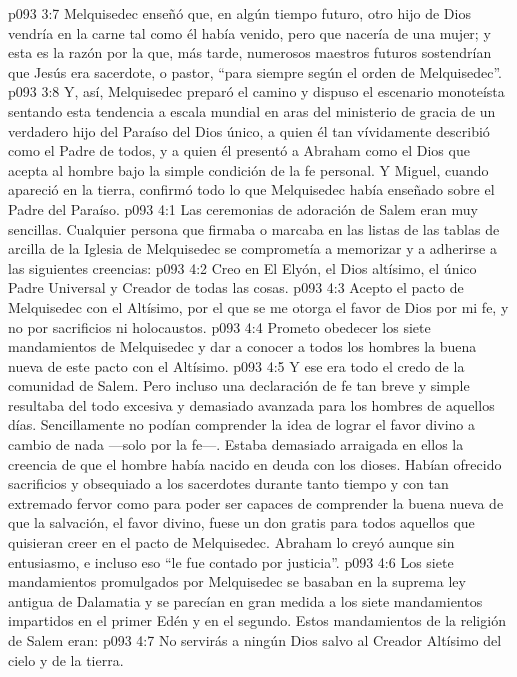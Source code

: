 \vs p093 3:7 Melquisedec enseñó que, en algún tiempo futuro, otro hijo de Dios vendría en la carne tal como él había venido, pero que nacería de una mujer; y esta es la razón por la que, más tarde, numerosos maestros futuros sostendrían que Jesús era sacerdote, o pastor, “para siempre según el orden de Melquisedec”.
\vs p093 3:8 Y, así, Melquisedec preparó el camino y dispuso el escenario monoteísta sentando esta tendencia a escala mundial en aras del ministerio de gracia de un verdadero hijo del Paraíso del Dios único, a quien él tan vívidamente describió como el Padre de todos, y a quien él presentó a Abraham como el Dios que acepta al hombre bajo la simple condición de la fe personal. Y Miguel, cuando apareció en la tierra, confirmó todo lo que Melquisedec había enseñado sobre el Padre del Paraíso.
\vs p093 4:1 Las ceremonias de adoración de Salem eran muy sencillas. Cualquier persona que firmaba o marcaba en las listas de las tablas de arcilla de la Iglesia de Melquisedec se comprometía a memorizar y a adherirse a las siguientes creencias:
\vs p093 4:2 Creo en El Elyón, el Dios altísimo, el único Padre Universal y Creador de todas las cosas.
\vs p093 4:3 Acepto el pacto de Melquisedec con el Altísimo, por el que se me otorga el favor de Dios por mi fe, y no por sacrificios ni holocaustos.
\vs p093 4:4 Prometo obedecer los siete mandamientos de Melquisedec y dar a conocer a todos los hombres la buena nueva de este pacto con el Altísimo.
\vs p093 4:5 \pc Y ese era todo el credo de la comunidad de Salem. Pero incluso una declaración de fe tan breve y simple resultaba del todo excesiva y demasiado avanzada para los hombres de aquellos días. Sencillamente no podían comprender la idea de lograr el favor divino a cambio de nada ---solo por la fe---. Estaba demasiado arraigada en ellos la creencia de que el hombre había nacido en deuda con los dioses. Habían ofrecido sacrificios y obsequiado a los sacerdotes durante tanto tiempo y con tan extremado fervor como para poder ser capaces de comprender la buena nueva de que la salvación, el favor divino, fuese un don gratis para todos aquellos que quisieran creer en el pacto de Melquisedec. Abraham lo creyó aunque sin entusiasmo, e incluso eso “le fue contado por justicia”.
\vs p093 4:6 \pc Los siete mandamientos promulgados por Melquisedec se basaban en la suprema ley antigua de Dalamatia y se parecían en gran medida a los siete mandamientos impartidos en el primer Edén y en el segundo. Estos mandamientos de la religión de Salem eran:
\vs p093 4:7 No servirás a ningún Dios salvo al Creador Altísimo del cielo y de la tierra.
